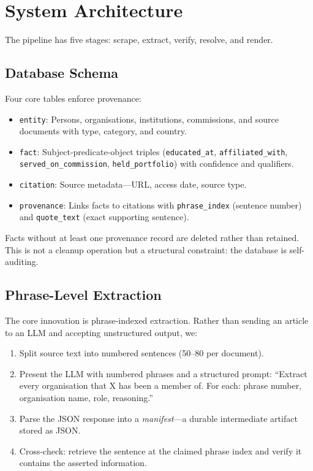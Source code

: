 \documentclass[11pt,a4paper]{article}
\begin{document}
\section{System Architecture}

The pipeline has five stages: scrape, extract, verify, resolve, and render.

\subsection{Database Schema}

Four core tables enforce provenance:

\begin{itemize}
\item \texttt{entity}: Persons, organisations, institutions, commissions, and source documents with type, category, and country.
\item \texttt{fact}: Subject-predicate-object triples (\texttt{educated\_at}, \texttt{affiliated\_with}, \texttt{served\_on\_commission}, \texttt{held\_portfolio}) with confidence and qualifiers.
\item \texttt{citation}: Source metadata---URL, access date, source type.
\item \texttt{provenance}: Links facts to citations with \texttt{phrase\_index} (sentence number) and \texttt{quote\_text} (exact supporting sentence).
\end{itemize}

Facts without at least one provenance record are deleted rather than retained. This is not a cleanup operation but a structural constraint: the database is self-auditing.

\subsection{Phrase-Level Extraction}

The core innovation is phrase-indexed extraction. Rather than sending an article to an LLM and accepting unstructured output, we:

\begin{enumerate}
\item Split source text into numbered sentences (50--80 per document).
\item Present the LLM with numbered phrases and a structured prompt: ``Extract every organisation that X has been a member of. For each: phrase number, organisation name, role, reasoning.''
\item Parse the JSON response into a \emph{manifest}---a durable intermediate artifact stored as JSON.
\item Cross-check: retrieve the sentence at the claimed phrase index and verify it contains the asserted information.
\end{enumerate}
\end{document}
